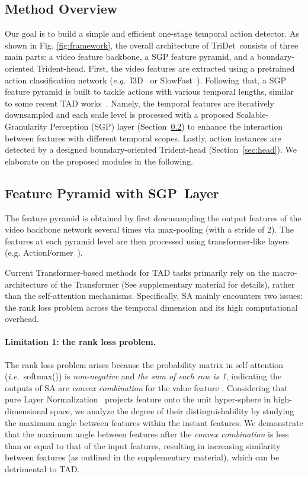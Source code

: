 \documentclass[10pt,twocolumn,letterpaper]{article}
\def\ie{{\em i.e.}}
\def\eg{{\em e.g.}}
\newcommand{\figref}[1]{Fig. \ref{#1}}
\def\name{TriDet}
\def\modulename{SGP}
\begin{document}
\subsection{Method Overview}
Our goal is to build a simple and efficient one-stage temporal action detector. 
As shown in \figref{fig:framework}, the overall architecture of \name~consists of three main parts: a video feature backbone, a SGP feature pyramid, and a boundary-oriented Trident-head. 
First, the video features are extracted using a pretrained action classification network (\eg{~I3D~\cite{carreira2017quo} or SlowFast~\cite{feichtenhofer2019slowfast}}). Following that, a SGP feature pyramid is built to tackle actions with various temporal lengths, similar to some recent TAD works~\cite{lin2021learning,zhang2022actionformer,cheng2022tallformer}.
Namely, the temporal features are iteratively downsampled and each scale level is processed with a proposed Scalable-Granularity Perception (\modulename) layer (Section~\ref{sec:efp}) to enhance the interaction between features with different temporal scopes. 
Lastly, action instances are detected by a designed boundary-oriented Trident-head (Section~\ref{sec:head}). 
We elaborate on the proposed modules in the following. 


\subsection{Feature Pyramid with \modulename~Layer}
\label{sec:efp}

The feature pyramid is obtained by first downsampling the output features of the video backbone network several times via max-pooling (with a stride of 2). The features at each pyramid level are then processed using transformer-like layers (e.g. ActionFormer~\cite{zhang2022actionformer}). 

Current Transformer-based methods for TAD tasks primarily rely on the macro-architecture of the Transformer (See supplementary material for details), rather than the self-attention mechanisms. Specifically, SA mainly encounters two issues: the rank loss problem across the temporal dimension and its high computational overhead.

\paragraph{Limitation 1: the rank loss problem.}
The rank loss problem arises because the probability matrix in self-attention (\ie~softmax()) is \emph{non-negative} and \emph{the sum of each row is 1}, indicating the outputs of SA are \emph{convex combination} for the value feature . Considering that pure Layer Normalization~\cite{ba2016layer} projects feature onto the unit hyper-sphere in high-dimensional space, we analyze the degree of their distinguishability by studying the maximum angle between features within the instant features. We demonstrate that the maximum angle between features after the \emph{convex combination} is less than or equal to that of the input features, resulting in increasing similarity between features (as outlined in the supplementary material), which can be detrimental to TAD. 
\end{document}
